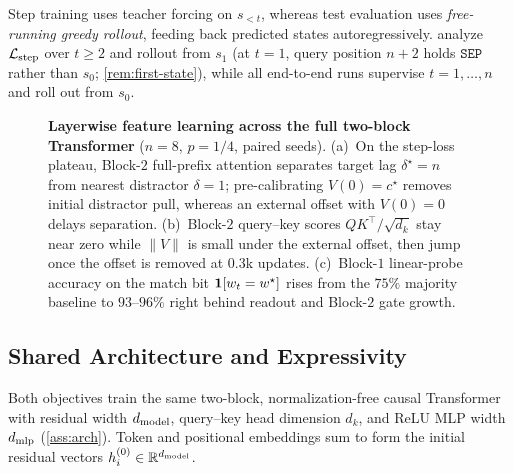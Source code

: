 Step training uses teacher forcing on $s_{<t}$, whereas test evaluation uses \emph{free-running greedy rollout}, feeding back predicted states autoregressively.  analyze $\mathcal L_{\mathrm{step}}$ over $t \ge 2$ and rollout from $s_1$ (at $t = 1$, query position $n+2$ holds $\mathtt{SEP}$ rather than $s_0$; \cref{rem:first-state}), while all end-to-end runs supervise $t = 1, \ldots, n$ and roll out from $s_0$.

\begin{figure}[t]
\centering
\fitwidth{}
\caption{\textbf{Layerwise feature learning across the full two-block Transformer} ($n=8$, $p=1/4$, paired seeds). (a)~On the step-loss plateau, Block-$2$ full-prefix attention separates target lag $\delta^\star = n$ from nearest distractor $\delta = 1$; pre-calibrating $V(0) = c^\star$ removes initial distractor pull, whereas an external offset with $V(0)=0$ delays separation. (b)~Block-$2$ query--key scores $QK^\top/\sqrt{d_k}$ stay near zero while $\|V\|$ is small under the external offset, then jump once the offset is removed at $0.3$k updates. (c)~Block-$1$ linear-probe accuracy on the match bit $\mathbf 1[w_t = w^\star]$ rises from the $75\%$ majority baseline to $93$--$96\%$ right behind readout and Block-$2$ gate growth.}
\label{fig:feature-learning}
\end{figure}

\subsection{Shared Architecture and Expressivity}
\label{sec:exact-programs}
\label{tab:scope}

Both objectives train the same two-block, normalization-free causal Transformer with residual width $d_{\mathrm{model}}$, query--key head dimension $d_k$, and ReLU MLP width $d_{\mathrm{mlp}}$ (\cref{ass:arch}). Token and positional embeddings sum to form the initial residual vectors $h_i^{(0)} \in \mathbb R^{d_{\mathrm{model}}}$.

